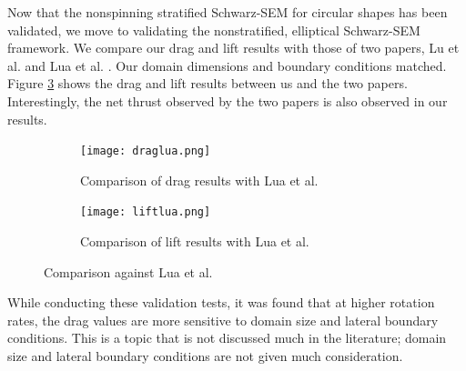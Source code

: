 Now that the nonspinning stratified Schwarz-SEM for circular shapes has been validated, we move to validating the nonstratified, elliptical Schwarz-SEM framework. We compare our drag and lift results with those of two papers, Lu et al. \cite{lu_flow_2018} and Lua et al. \cite{lua_rotating_2018}. Our domain dimensions and boundary conditions matched. Figure \ref{fig:lua_com} shows the drag and lift results between us and the two papers. Interestingly, the net thrust observed by the two papers is also observed in our results.
\begin{figure}
    \centering
    \begin{subfigure}{0.49\textwidth}
    \texttt{[image: draglua.png]}
    \caption{Comparison of drag results with Lua et al.}
    \label{fig:lua drag}
    \end{subfigure}
    \begin{subfigure}{0.49\textwidth}
    \texttt{[image: liftlua.png]}
    \caption{Comparison of lift results with Lua et al.}
    \label{fig:lua lift}
    \end{subfigure}
    \caption{Comparison against Lua et al.}
    \label{fig:lua_com}
\end{figure}
While conducting these validation tests, it was found that at higher rotation rates, the drag values are more sensitive to domain size and lateral boundary conditions. This is a topic that is not discussed much in the literature; domain size and lateral boundary conditions are not given much consideration. 


